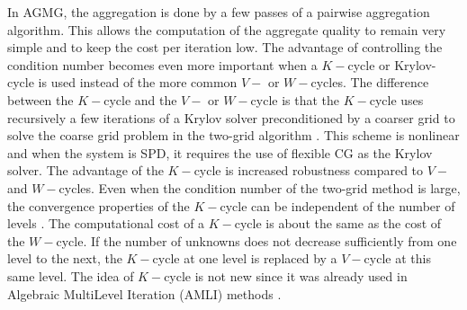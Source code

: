 In AGMG, the aggregation is done by a few passes of a pairwise aggregation 
algorithm. This allows the computation of the aggregate quality to remain very 
simple and to keep the cost per iteration low. The advantage of controlling the 
condition number becomes even more important when a $K-$cycle or Krylov-cycle is 
used instead of the more common $V-$ or $W-$cycles. The difference between the 
$K-$cycle and the $V-$ or $W-$cycle is that the $K-$cycle uses recursively a 
few iterations of a Krylov solver preconditioned by a coarser grid to solve 
the coarse grid problem in the two-grid algorithm \cite{k_cycle}. This scheme 
is nonlinear and when the system is SPD, it requires the use of flexible CG 
\cite{fcg_2,fcg_3,fcg_4,fcg} as the Krylov solver. The advantage of the $K-$cycle 
is increased robustness compared to $V-$ and $W-$cycles. Even when the condition 
number of the two-grid method is large, the convergence properties of the 
$K-$cycle can be independent of the number of levels \cite{k_cycle}. The 
computational cost of a $K-$cycle is about the same as the cost of the 
$W-$cycle. If the number of unknowns does not decrease sufficiently from one 
level to the next, the $K-$cycle at one level is replaced by a $V-$cycle at 
this same level. The idea of $K-$cycle is not new since it was already used 
in Algebraic MultiLevel Iteration (AMLI) methods \cite{amli,notay2005}.

